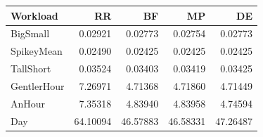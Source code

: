\begin{tabular}{lrrrr}
\toprule
Workload & RR & BF & MP & DE \\
\midrule
BigSmall & 0.02921 & 0.02773 & 0.02754 & 0.02773 \\
SpikeyMean & 0.02490 & 0.02425 & 0.02425 & 0.02425 \\
TallShort & 0.03524 & 0.03403 & 0.03419 & 0.03425 \\
GentlerHour & 7.26971 & 4.71368 & 4.71860 & 4.71449 \\
AnHour & 7.35318 & 4.83940 & 4.83958 & 4.74594 \\
Day & 64.10094 & 46.57883 & 46.58331 & 47.26487 \\
\bottomrule
\end{tabular}
